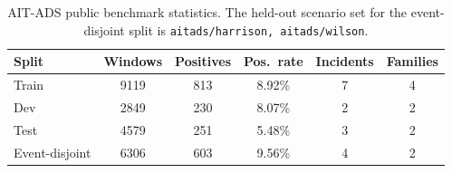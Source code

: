 \begin{table}[t]
\centering
\small
\setlength{\tabcolsep}{3.8pt}
\caption{AIT-ADS public benchmark statistics. The held-out scenario set for the event-disjoint split is \texttt{aitads/harrison, aitads/wilson}.}
\label{tab:aitads-public-stats}
\begin{tabular}{lccccc}
\toprule
Split & Windows & Positives & Pos.\ rate & Incidents & Families \\
\midrule
Train & 9119 & 813 & 8.92\% & 7 & 4 \\
Dev & 2849 & 230 & 8.07\% & 2 & 2 \\
Test & 4579 & 251 & 5.48\% & 3 & 2 \\
Event-disjoint & 6306 & 603 & 9.56\% & 4 & 2 \\
\bottomrule
\end{tabular}
\end{table}
